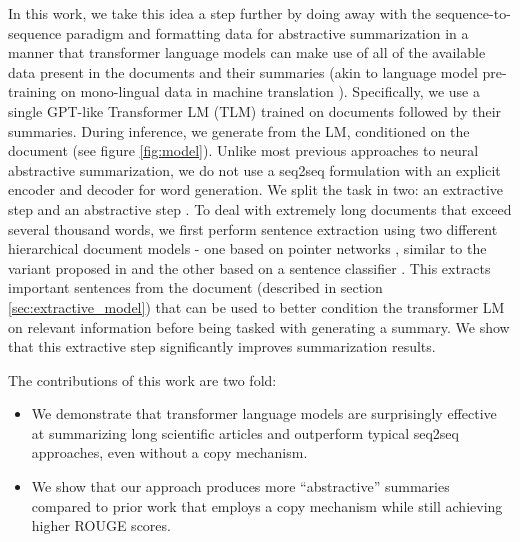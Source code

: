 \documentclass[letterpaper]{article} \usepackage{arXiv_V2_aaai_sty_mods}  \usepackage{times}  \usepackage{helvet} \usepackage{courier}  \usepackage[hyphens]{url}  \usepackage{graphicx} \usepackage[utf8]{inputenc} \usepackage[T1]{fontenc}    \usepackage{url}            \usepackage{booktabs}       \usepackage{amsfonts}       \usepackage{nicefrac}       \usepackage{multirow}
\begin{document}
In this work, we take this idea a step further by doing away with the sequence-to-sequence paradigm and formatting data for abstractive summarization in a manner that transformer language models can make use of all of the available data present in the documents and their summaries (akin to language model pre-training on mono-lingual data in machine translation \cite{gulcehre2015using}). Specifically, we use a single GPT-like Transformer LM (TLM) trained on documents followed by their summaries. During inference, we generate from the LM, conditioned on the document (see figure \ref{fig:model}). Unlike most previous approaches to neural abstractive summarization, we do not use a seq2seq formulation with an explicit encoder and decoder for word generation. We split the task in two: an extractive step and an abstractive step \cite{chen2018fast,gehrmann2018bottom}. To deal with extremely long documents that exceed several thousand words, we first perform sentence extraction using two different hierarchical document models - one based on pointer networks \cite{vinyals2015pointer}, similar to the variant proposed in \cite{chen2018fast} and the other based on a sentence classifier \cite{nallapati2017summarunner}. This extracts important sentences from the document (described in section \ref{sec:extractive_model}) that can be used to better condition the transformer LM on relevant information before being tasked with generating a summary. We show that this extractive step significantly improves summarization results.

The contributions of this work are two fold:

\begin{itemize}
    \item We demonstrate that transformer language models are surprisingly effective at summarizing long scientific articles and outperform typical seq2seq approaches, even without a copy mechanism.
    \item We show that our approach produces more ``abstractive'' summaries compared to prior work that employs a copy mechanism \cite{asee2017pointer} while still achieving higher ROUGE scores.
\end{itemize}
\end{document}
